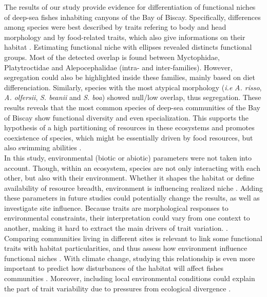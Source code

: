 
The results of our study provide evidence for differentiation of functional niches of deep-sea fishes inhabiting canyons of the Bay of Biscay. Specifically, differences among species were best described by traits refering to body and head morphology and by food-related traits, which also give informations on their habitat \citep{schoenfuss2007}. Estimating functional niche with ellipses revealed distincts functional groups. Most of the detected overlap is found between Myctophidae, Platytroctidae and Alepocephalidae (intra- and inter-families). However, segregation could also be highlighted inside these families, mainly based on diet differenciation. Similarly, species with the most atypical morphology (\emph{i.e} \textit{A. risso}, \textit{A. olfersii}, \textit{S. beanii} and \textit{S. boa}) showed null/low overlap, thus segregation. These results reveals that the most common species of deep-sea communities of the Bay of Biscay show functional diversity and even specialization. This supports the hypothesis of a high partitioning of resources in these ecosystems and promotes coexistence of species, which might be essentially driven by food resources, but also swimming abilities \citep{aneeshkumar2017,preciado2017}.\\

In this study, environmental (biotic or abiotic) parameters were not taken into account. Though, within an ecosystem, species are not only interacting with each other, but also with their environment. Whether it shapes the habitat or define availability of resource breadth, environment is influencing realized niche \citep{costa-pereira2019,ibanez2007,kremer2017}. Adding these parameters in future studies could potentially change the results, as well as investigate site influence. Because traits are morphological responses to environmental constraints, their interpretation could vary from one context to another, making it hard to extract the main drivers of trait variation.  \citep{kremer2017}. Comparing communities living in different sites is relevant to link some functional traits with habitat particularities, and thus assess how environment influence functional niches \citep{mejri2009}. With climate change, studying this relationship is even more important to predict how disturbances of the habitat will affect fishes communities \citep{brindamour2011}. Moreover, including local environmental conditions could explain the part of trait variability due to pressures from ecological divergence \citep{dasilva2019}.

